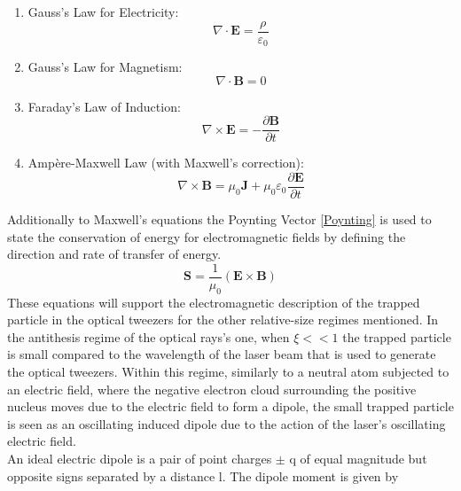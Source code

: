 \documentclass[letterpaper,12pt,oneside]{book}
\begin{document}
\begin{enumerate}
    \item Gauss's Law for Electricity:
    \begin{equation}
        \nabla \cdot \mathbf{E} = \frac{\rho}{\varepsilon_0}
    \end{equation}
    
    \item Gauss's Law for Magnetism:
    \begin{equation}
        \nabla \cdot \mathbf{B} = 0
    \end{equation}
    
    \item Faraday's Law of Induction:
    \begin{equation}
        \nabla \times \mathbf{E} = -\frac{\partial \mathbf{B}}{\partial t}
    \end{equation}
    
    \item Ampère-Maxwell Law (with Maxwell's correction):
    \begin{equation}
        \nabla \times \mathbf{B} = \mu_0\mathbf{J} + \mu_0\varepsilon_0 \frac{\partial \mathbf{E}}{\partial t}
    \end{equation}
    \label{Maxwell}
\end{enumerate}
Additionally to Maxwell's equations the Poynting Vector \eqref{Poynting} is used to state the conservation of energy for electromagnetic fields by defining the direction and rate of transfer of energy. 
\begin{equation}
    \mathbf{S} = \frac{1}{\mu_0} (\mathbf{E} \times \mathbf{B})
    \label{Poynting}
\end{equation}
 These equations will support the electromagnetic description of the trapped particle in the optical tweezers for the other relative-size regimes mentioned. In the antithesis regime of the optical rays's one, when $\xi << 1$ the trapped particle is small compared to the wavelength of the laser beam that is used to generate the optical tweezers. Within this regime, similarly to a neutral atom subjected to an electric field, where the negative electron cloud surrounding the positive nucleus moves due to the electric field to form a dipole, the small trapped particle is seen as an oscillating induced dipole due to the action of the laser's oscillating electric field.
 \\ An ideal electric dipole is a pair of point charges $\pm$ q of equal magnitude but opposite signs separated by a distance l. The dipole moment is given by 
\end{document}

